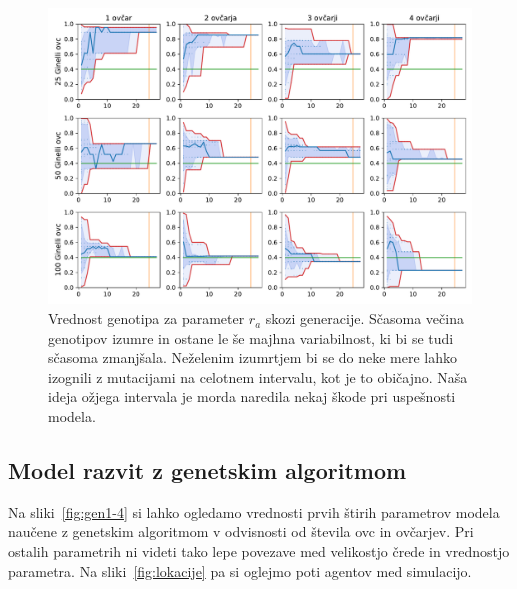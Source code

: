 \begin{figure}[H]  %
\centering
\includegraphics[height=0.4\textheight]{../poglavja/grafi/Ginelli-evolucija-Gen2.pdf}
\caption[Vrednost genotipa za parameter $r_a$ skozi generacije]{Vrednost genotipa za parameter $r_a$ skozi generacije. Sčasoma večina genotipov izumre in ostane le še majhna variabilnost, ki bi se tudi sčasoma zmanjšala. Neželenim izumrtjem bi se do neke mere lahko izognili z mutacijami na celotnem intervalu, kot je to običajno. Naša ideja ožjega intervala je morda naredila nekaj škode pri uspešnosti modela.} %
\label{fig:Ge-gen2}
\end{figure}

\subsection{Model razvit z genetskim algoritmom}

Na sliki~\ref{fig:gen1-4} si lahko ogledamo vrednosti prvih štirih parametrov modela naučene z genetskim algoritmom v odvisnosti od števila ovc in ovčarjev. Pri ostalih parametrih ni videti tako lepe povezave med velikostjo črede in vrednostjo parametra. Na sliki~\ref{fig:lokacije} pa si oglejmo poti agentov med simulacijo.

